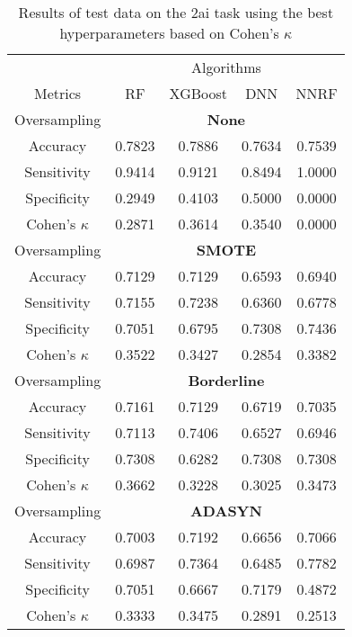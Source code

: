 \begin{table}[!htb]
\centering
\caption{Results of test data on the 2ai task using the best hyperparameters based on Cohen's $\kappa$}
\label{tab:2ai_test_results}
\begin{tabular}{c | c c c c}
\hline
 & \multicolumn{4}{c}{Algorithms}\\ 
Metrics &RF & XGBoost & DNN & NNRF\\ 
\hline
Oversampling &\multicolumn{4}{|c}{\textbf{None}}\\ 
\hline
Accuracy & 0.7823 & 0.7886 & 0.7634 & 0.7539\\ 
Sensitivity & 0.9414 & 0.9121 & 0.8494 & 1.0000\\ 
Specificity & 0.2949 & 0.4103 & 0.5000 & 0.0000\\ 
Cohen's $\kappa$ & 0.2871 & 0.3614 & 0.3540 & 0.0000\\ 
\hline
Oversampling &\multicolumn{4}{|c}{\textbf{SMOTE}}\\ 
\hline
Accuracy & 0.7129 & 0.7129 & 0.6593 & 0.6940\\ 
Sensitivity & 0.7155 & 0.7238 & 0.6360 & 0.6778\\ 
Specificity & 0.7051 & 0.6795 & 0.7308 & 0.7436\\ 
Cohen's $\kappa$ & 0.3522 & 0.3427 & 0.2854 & 0.3382\\ 
\hline
Oversampling &\multicolumn{4}{|c}{\textbf{Borderline}}\\ 
\hline
Accuracy & 0.7161 & 0.7129 & 0.6719 & 0.7035\\ 
Sensitivity & 0.7113 & 0.7406 & 0.6527 & 0.6946\\ 
Specificity & 0.7308 & 0.6282 & 0.7308 & 0.7308\\ 
Cohen's $\kappa$ & 0.3662 & 0.3228 & 0.3025 & 0.3473\\ 
\hline
Oversampling &\multicolumn{4}{|c}{\textbf{ADASYN}}\\ 
\hline
Accuracy & 0.7003 & 0.7192 & 0.6656 & 0.7066\\ 
Sensitivity & 0.6987 & 0.7364 & 0.6485 & 0.7782\\ 
Specificity & 0.7051 & 0.6667 & 0.7179 & 0.4872\\ 
Cohen's $\kappa$ & 0.3333 & 0.3475 & 0.2891 & 0.2513\\ 
\hline
\end{tabular}
\end{table}

